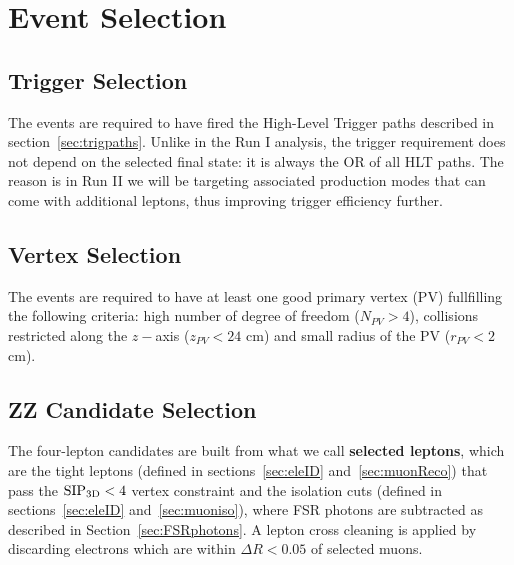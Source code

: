 \section{Event Selection}
\label{sec:eventsel}


\subsection{Trigger Selection}
\label{sec:HLTsel}

The events are required to have fired the High-Level Trigger paths described in section~\ref{sec:trigpaths}. Unlike in the Run I analysis, the trigger requirement does not depend on the selected final state: it is always the OR of all HLT paths. The reason is in Run II we will be targeting associated production modes that can come with additional leptons, thus improving trigger efficiency further.


\subsection{Vertex Selection}
\label{sec:vertexsel}

The events are required to have at least one good primary
vertex (PV) fullfilling the following criteria: high number of degree
of freedom ($N_{PV}>4$), collisions restricted along the $z-$axis
($z_{PV}<24$ cm) and small radius of the PV ($r_{PV}<2$ cm).


\subsection{ZZ Candidate Selection}
\label{sec:zzcandsel}

The four-lepton candidates are built from what we call {\bf selected leptons}, which  
are the tight leptons (defined in sections~\ref{sec:eleID} and~\ref{sec:muonReco}) that pass the ${\rm SIP_{3D}} < 4$ vertex constraint
and the isolation cuts (defined in sections~\ref{sec:eleID} and~\ref{sec:muoniso}), 
where FSR photons are subtracted as described in Section~\ref{sec:FSRphotons}.
A lepton cross cleaning is applied 
by discarding electrons which are within $\Delta R < 0.05$ of selected muons. 


